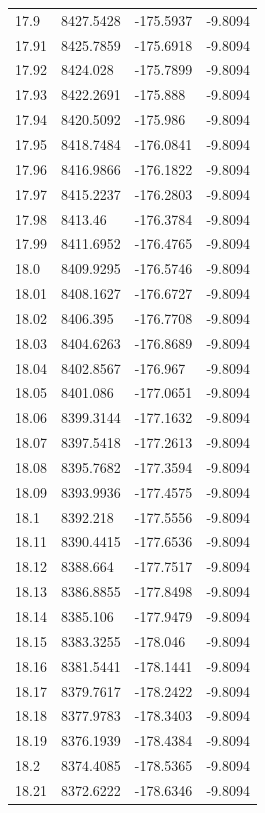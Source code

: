 \begin{table}[H]
\begin{tabular}{llll}
17.9 & 8427.5428 & -175.5937 & -9.8094 \\
17.91 & 8425.7859 & -175.6918 & -9.8094 \\
17.92 & 8424.028 & -175.7899 & -9.8094 \\
17.93 & 8422.2691 & -175.888 & -9.8094 \\
17.94 & 8420.5092 & -175.986 & -9.8094 \\
17.95 & 8418.7484 & -176.0841 & -9.8094 \\
17.96 & 8416.9866 & -176.1822 & -9.8094 \\
17.97 & 8415.2237 & -176.2803 & -9.8094 \\
17.98 & 8413.46 & -176.3784 & -9.8094 \\
17.99 & 8411.6952 & -176.4765 & -9.8094 \\
18.0 & 8409.9295 & -176.5746 & -9.8094 \\
18.01 & 8408.1627 & -176.6727 & -9.8094 \\
18.02 & 8406.395 & -176.7708 & -9.8094 \\
18.03 & 8404.6263 & -176.8689 & -9.8094 \\
18.04 & 8402.8567 & -176.967 & -9.8094 \\
18.05 & 8401.086 & -177.0651 & -9.8094 \\
18.06 & 8399.3144 & -177.1632 & -9.8094 \\
18.07 & 8397.5418 & -177.2613 & -9.8094 \\
18.08 & 8395.7682 & -177.3594 & -9.8094 \\
18.09 & 8393.9936 & -177.4575 & -9.8094 \\
18.1 & 8392.218 & -177.5556 & -9.8094 \\
18.11 & 8390.4415 & -177.6536 & -9.8094 \\
18.12 & 8388.664 & -177.7517 & -9.8094 \\
18.13 & 8386.8855 & -177.8498 & -9.8094 \\
18.14 & 8385.106 & -177.9479 & -9.8094 \\
18.15 & 8383.3255 & -178.046 & -9.8094 \\
18.16 & 8381.5441 & -178.1441 & -9.8094 \\
18.17 & 8379.7617 & -178.2422 & -9.8094 \\
18.18 & 8377.9783 & -178.3403 & -9.8094 \\
18.19 & 8376.1939 & -178.4384 & -9.8094 \\
18.2 & 8374.4085 & -178.5365 & -9.8094 \\
18.21 & 8372.6222 & -178.6346 & -9.8094 \\

\end{tabular}
\end{table}
